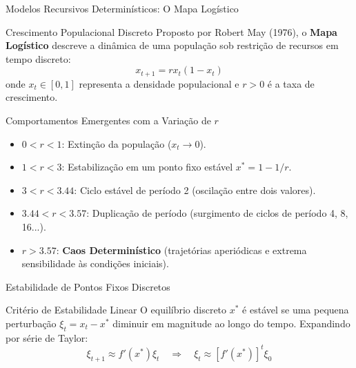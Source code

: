 \begin{frame}[allowframebreaks]{Modelos Recursivos Determinísticos: O Mapa Logístico}
\begin{block}{Crescimento Populacional Discreto}
Proposto por Robert May (1976), o \textbf{Mapa Logístico} descreve a dinâmica de uma população sob restrição de recursos em tempo discreto:
\begin{equation*}
x_{t+1} = r x_t (1 - x_t)
\end{equation*}
onde $x_t \in [0, 1]$ representa a densidade populacional e $r > 0$ é a taxa de crescimento.
\end{block}

\begin{exampleblock}{Comportamentos Emergentes com a Variação de $r$}
\begin{itemize}
    \item $0 < r < 1$: Extinção da população ($x_t \to 0$).
    \item $1 < r < 3$: Estabilização em um ponto fixo estável $x^* = 1 - 1/r$.
    \item $3 < r < 3.44$: Ciclo estável de período 2 (oscilação entre dois valores).
    \item $3.44 < r < 3.57$: Duplicação de período (surgimento de ciclos de período 4, 8, 16...).
    \item $r > 3.57$: \textbf{Caos Determinístico} (trajetórias aperiódicas e extrema sensibilidade às condições iniciais).
\end{itemize}
\end{exampleblock}
\end{frame}

\begin{frame}[allowframebreaks]{Estabilidade de Pontos Fixos Discretos}

\begin{block}{Critério de Estabilidade Linear}
O equilíbrio discreto $x^*$ é estável se uma pequena perturbação $\xi_t = x_t - x^*$ diminuir em magnitude ao longo do tempo. Expandindo por série de Taylor:
\begin{equation*}
\xi_{t+1} \approx f'(x^*) \xi_t \quad \Rightarrow \quad \xi_t \approx [f'(x^*)]^t \xi_0
\end{equation*}
\end{block}

\end{frame}

